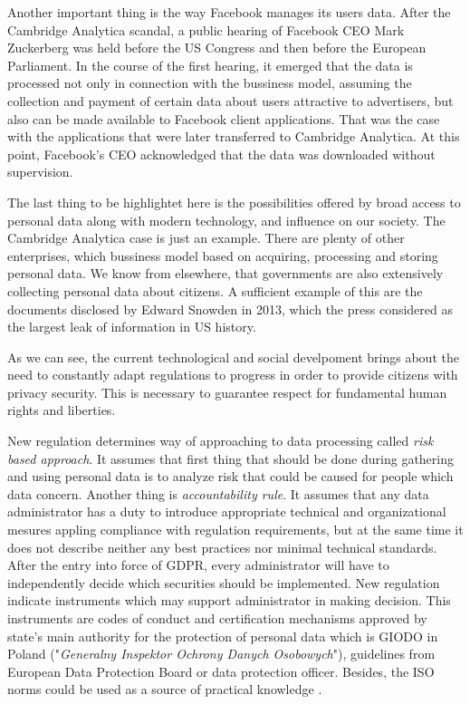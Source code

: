 \documentclass[en, noamssymb]{mgr}
\begin{document}
\indent Another important thing is the way Facebook manages its users data. After the Cambridge Analytica scandal, a public hearing of Facebook CEO Mark Zuckerberg was held before the US Congress and then before the European Parliament. In the course of the first hearing, it emerged that the data is processed not only in connection with the bussiness model, assuming the collection and payment of certain data about users attractive to advertisers, but also can be made available to Facebook client applications. That was the case with the applications that were later transferred to Cambridge Analytica. At this point, Facebook's CEO acknowledged that the data was downloaded without supervision.     

\indent The last thing to be highlightet here is the possibilities offered by broad access to personal data along with modern technology, and influence on our society.
The Cambridge Analytica case is just an example. There are plenty of other enterprises, which bussiness model based on acquiring, processing and storing personal data. We know from elsewhere, that governments are also extensively collecting personal data about citizens. A sufficient example of this are the documents disclosed by Edward Snowden in 2013, which the press considered as the largest leak of information in US history.

\indent As we can see, the current technological and social develpoment brings about the need to constantly adapt regulations to progress in order to provide citizens with privacy security. This is necessary to guarantee respect for fundamental human rights and liberties.

\indent New regulation determines way of approaching to data processing called \textit{risk based approach}. It assumes that first thing that should be done during gathering and using personal data is to analyze risk that could be caused for people which data concern. Another thing is \textit{accountability rule}. It assumes that any data administrator has a duty to introduce appropriate technical and organizational mesures appling compliance with regulation requirements, but at the same time it does not describe neither any best practices nor minimal technical standards. After the entry into force of GDPR, every administrator will have to independently decide which securities should be implemented. New regulation indicate instruments which may support administrator in making decision. This instruments are codes of conduct and certification mechanisms approved by state's main authority for the protection of personal data which is GIODO in Poland ("\textit{Generalny Inspektor Ochrony Danych Osobowych}"), guidelines from European Data Protection Board or data protection officer. Besides, the ISO norms could be used as a source of practical knowledge \cite{giodo}.
\end{document}
